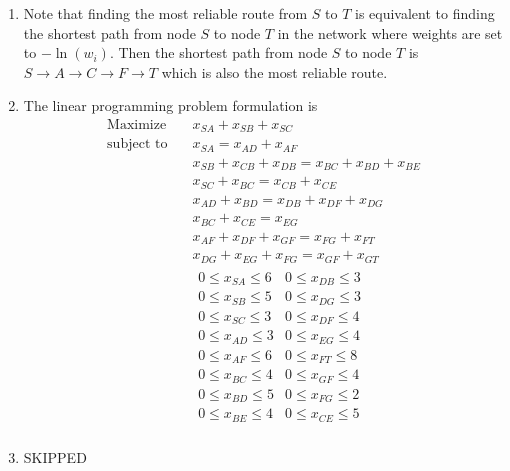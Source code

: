 \begin{enumerate}
\begin{center}
          \end{center}
          Running Dijkstra's algorithm results in the shortest path of \(0 \to 1 \to 4\) with distance 15.
    \item Note that finding the most reliable route from \(S\) to \(T\) is equivalent to finding the shortest path from node \(S\) to node \(T\) in the network where weights are set to \(-\ln(w_i)\). Then the shortest path from node \(S\) to node \(T\) is \(S \to A \to C \to F \to T\) which is also the most reliable route.
    \item The linear programming problem formulation is
          \begin{align*}
              \text{Maximize} \quad
               & x_{SA} + x_{SB} + x_{SC}                            \\
              \text{subject to} \quad
               & x_{SA} = x_{AD} + x_{AF}                            \\
               & x_{SB} + x_{CB} + x_{DB} = x_{BC} + x_{BD} + x_{BE} \\
               & x_{SC} + x_{BC} = x_{CB} + x_{CE}                   \\
               & x_{AD} + x_{BD} = x_{DB} + x_{DF} + x_{DG}          \\
               & x_{BC} + x_{CE} = x_{EG}                            \\
               & x_{AF} + x_{DF} + x_{GF} = x_{FG} + x_{FT}          \\
               & x_{DG} + x_{EG} + x_{FG} = x_{GF} + x_{GT}          \\
               & \begin{array}{ll}
                  0 \leq x_{SA} \leq 6 & 0 \leq x_{DB} \leq 3 \\
                  0 \leq x_{SB} \leq 5 & 0 \leq x_{DG} \leq 3 \\
                  0 \leq x_{SC} \leq 3 & 0 \leq x_{DF} \leq 4 \\
                  0 \leq x_{AD} \leq 3 & 0 \leq x_{EG} \leq 4 \\
                  0 \leq x_{AF} \leq 6 & 0 \leq x_{FT} \leq 8 \\
                  0 \leq x_{BC} \leq 4 & 0 \leq x_{GF} \leq 4 \\
                  0 \leq x_{BD} \leq 5 & 0 \leq x_{FG} \leq 2 \\
                  0 \leq x_{BE} \leq 4 & 0 \leq x_{CE} \leq 5 \\
              \end{array}
          \end{align*}
    \item {\color{red} SKIPPED}
\end{enumerate}


